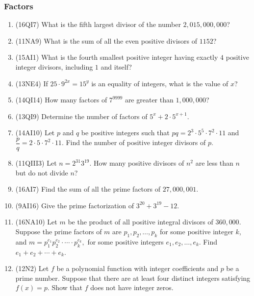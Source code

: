 \documentclass[10pt,paper=letter]{scrartcl}
\begin{document}
\subsubsection*{Factors}

\begin{enumerate}

\item (16QI7) What is the fifth largest divisor of the number $2,015,000,000$?

\item (11NA9) What is the sum of all the even positive divisors of $1152$?

\item (15AI1) What is the fourth smallest positive integer having exactly $4$ positive integer divisors, including $1$ and itself?

\item (13NE4) If $25 \cdot 9^{2x} = 15^y$ is an equality of integers, what is the value of $x$?

\item (14QI14) How many factors of $7^{9999}$ are greater than $1,000,000$?

\item (13QI9) Determine the number of factors of $5^x + 2 \cdot 5^{x+1}$.

\item (14AI10) Let $p$ and $q$ be positive integers such that $pq = 2^3 \cdot 5^5 \cdot 7^2 \cdot 11$ and $\dfrac{p}{q} = 2 \cdot 5 \cdot 7^2 \cdot 11$. Find the number of positive integer divisors of $p$.

\item (11QIII3) Let $n = 2^{31}3^{19}$. How many positive divisors of $n^2$ are less than $n$ but do not divide $n$?

\item (16AI7) Find the sum of all the prime factors of $27,000,001$.

\item (9AI16) Give the prime factorization of $3^{20} + 3^{19} - 12$.

\item (16NA10) Let $m$ be the product of all positive integral divisors of $360,000$. Suppose the prime factors of $m$ are $p_1, p_2, \ldots, p_k$ for some positive integer $k$, and $m = p_1^{e_1}p_2^{e_2}\cdot \cdots \cdot p_k^{e_k},$ for some positive integers $e_1, e_2, \ldots, e_k$. Find $e_1 + e_2 + \cdots + e_k$.

\item (12N2) Let $f$ be a polynomial function with integer coefficients and $p$ be a prime number. Suppose that there are at least four distinct integers satisfying $f(x) = p$. Show that $f$ does not have integer zeros.

\end{enumerate}
\end{document}
